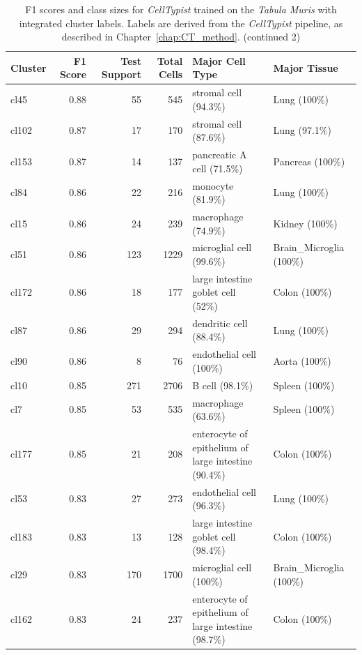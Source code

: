\begin{table}[ht!]
\scriptsize
\caption[F1 scores and class sizes for \textit{CellTypist} trained on the \textit{Tabula Muris} with integrated cluster labels (continued 2)]{F1 scores and class sizes for \textit{CellTypist} trained on the \textit{Tabula Muris} with integrated cluster labels. Labels are derived from the \textit{CellTypist} pipeline, as described in Chapter~\ref{chap:CT_method}. (continued 2)}
\centering
\label{table:tab_tmmodelclust2}
\begin{tabular}{lrrrll}
  \toprule
Cluster & F1 Score & Test Support & Total Cells & Major Cell Type & Major Tissue \\
  \midrule
  cl45 & 0.88 &  55 & 545 & stromal cell (94.3\%) & Lung (100\%) \\ 
  cl102 & 0.87 &  17 & 170 & stromal cell (87.6\%) & Lung (97.1\%) \\ 
  cl153 & 0.87 &  14 & 137 & pancreatic A cell (71.5\%) & Pancreas (100\%) \\ 
  cl84 & 0.86 &  22 & 216 & monocyte (81.9\%) & Lung (100\%) \\ 
  cl15 & 0.86 &  24 & 239 & macrophage (74.9\%) & Kidney (100\%) \\ 
  cl51 & 0.86 & 123 & 1229 & microglial cell (99.6\%) & Brain\_Microglia (100\%) \\ 
  cl172 & 0.86 &  18 & 177 & large intestine goblet cell (52\%) & Colon (100\%) \\ 
  cl87 & 0.86 &  29 & 294 & dendritic cell (88.4\%) & Lung (100\%) \\ 
  cl90 & 0.86 &   8 &  76 & endothelial cell (100\%) & Aorta (100\%) \\ 
  cl10 & 0.85 & 271 & 2706 & B cell (98.1\%) & Spleen (100\%) \\ 
  cl7 & 0.85 &  53 & 535 & macrophage (63.6\%) & Spleen (100\%) \\ 
  cl177 & 0.85 &  21 & 208 & \specialcell[t]{enterocyte of epithelium of\\large intestine (90.4\%)} & Colon (100\%) \\ 
  cl53 & 0.83 &  27 & 273 & endothelial cell (96.3\%) & Lung (100\%) \\ 
  cl183 & 0.83 &  13 & 128 & large intestine goblet cell (98.4\%) & Colon (100\%) \\ 
  cl29 & 0.83 & 170 & 1700 & microglial cell (100\%) & Brain\_Microglia (100\%) \\ 
  cl162 & 0.83 &  24 & 237 & \specialcell[t]{enterocyte of epithelium of\\large intestine (98.7\%)} & Colon (100\%) \\ 

\end{tabular}
\end{table}
